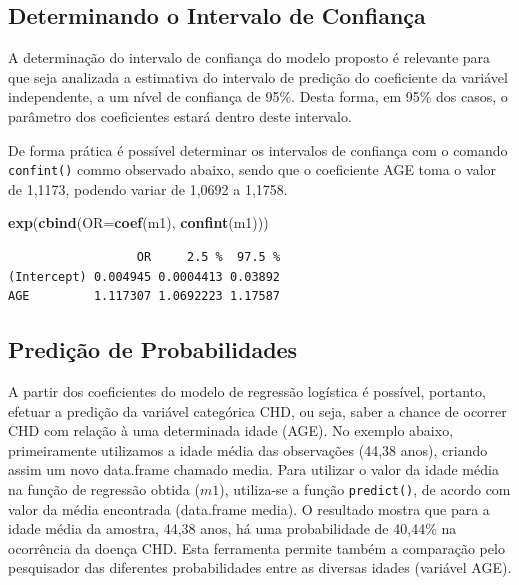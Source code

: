 \documentclass[12pt,brazil,oneside]{book}
\newenvironment{Shaded}{\begin{snugshade}}{\end{snugshade}}
\newcommand{\DataTypeTok}[1]{\textcolor[rgb]{0.13,0.29,0.53}{#1}}
\newcommand{\KeywordTok}[1]{\textcolor[rgb]{0.13,0.29,0.53}{\textbf{#1}}}
\newcommand{\NormalTok}[1]{#1}
\begin{document}
\hypertarget{determinando-o-intervalo-de-confianca}{%
\subsection{Determinando o Intervalo de
Confiança}\label{determinando-o-intervalo-de-confianca}}

A determinação do intervalo de confiança do modelo proposto é relevante
para que seja analizada a estimativa do intervalo de predição do
coeficiente da variável independente, a um nível de confiança de 95\%.
Desta forma, em 95\% dos casos, o parâmetro dos coeficientes estará
dentro deste intervalo.

De forma prática é possível determinar os intervalos de confiança com o
comando \texttt{confint()} commo observado abaixo, sendo que o
coeficiente AGE toma o valor de 1,1173, podendo variar de 1,0692 a
1,1758.

\begin{Shaded}
\begin{Highlighting}[]
\KeywordTok{exp}\NormalTok{(}\KeywordTok{cbind}\NormalTok{(}\DataTypeTok{OR=}\KeywordTok{coef}\NormalTok{(m1), }\KeywordTok{confint}\NormalTok{(m1)))}
\end{Highlighting}
\end{Shaded}

\begin{verbatim}
                  OR     2.5 %  97.5 %
(Intercept) 0.004945 0.0004413 0.03892
AGE         1.117307 1.0692223 1.17587
\end{verbatim}

\hypertarget{predicao-de-probabilidades}{%
\subsection{Predição de
Probabilidades}\label{predicao-de-probabilidades}}

A partir dos coeficientes do modelo de regressão logística é possível,
portanto, efetuar a predição da variável categórica CHD, ou seja, saber
a chance de ocorrer CHD com relação à uma determinada idade (AGE). No
exemplo abaixo, primeiramente utilizamos a idade média das observações
(44,38 anos), criando assim um novo data.frame chamado media. Para
utilizar o valor da idade média na função de regressão obtida (\(m1\)),
utiliza-se a função \texttt{predict()}, de acordo com valor da média
encontrada (data.frame media). O resultado mostra que para a idade média
da amostra, 44,38 anos, há uma probabilidade de 40,44\% na ocorrência da
doença CHD. Esta ferramenta permite também a comparação pelo pesquisador
das diferentes probabilidades entre as diversas idades (variável AGE).
\end{document}
